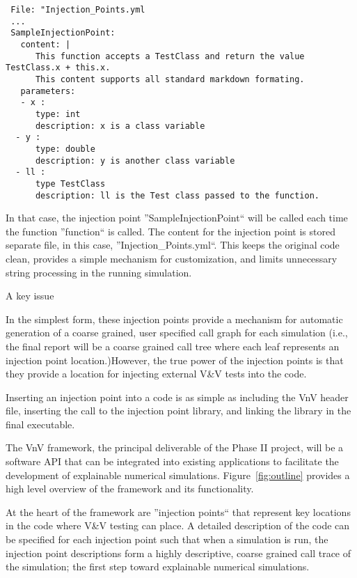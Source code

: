 \begin{verbatim}
 File: "Injection_Points.yml
 ...
 SampleInjectionPoint:
   content: | 
      This function accepts a TestClass and return the value TestClass.x + this.x.
      This content supports all standard markdown formating. 
   parameters:
   - x : 
      type: int 
      description: x is a class variable  
  - y : 
      type: double
      description: y is another class variable
  - ll : 
      type TestClass 
      description: ll is the Test class passed to the function. 
\end{verbatim}

In that case, the injection point ''SampleInjectionPoint`` will be called each time the function ''function`` is called. 
The content for the injection point is stored  separate file, in this case, ''Injection_Points.yml``. This keeps the original
code clean, provides a simple mechanism for customization, and limits unnecessary string processing in the running simulation. 

A key issue 




In the simplest form, these injection points provide a mechanism for automatic generation of a coarse grained, user specified call graph for 
each simulation (i.e., the final report will be a coarse grained call tree where each leaf represents an injection point location.)However, 
the true power of the injection points is that they provide a location for injecting external V&V tests into the 
code. 




Inserting an injection
point into a code is as simple as including the VnV header file, inserting the call to the injection point library, and linking the 
library in the final executable. 



The VnV framework, the principal deliverable of the Phase II project, will be a software API that can be integrated into existing applications to facilitate 
the development of explainable numerical simulations. Figure~\ref{fig:outline} provides a high level overview of the framework and its functionality. 

At the heart of the framework are ''injection points`` that represent key locations in the code where V&V testing can place. A detailed description of the code can be specified for each injection point 
such that when a simulation is run, the injection point descriptions form a highly descriptive, coarse grained call trace of the simulation; the first step toward explainable numerical simulations. 

